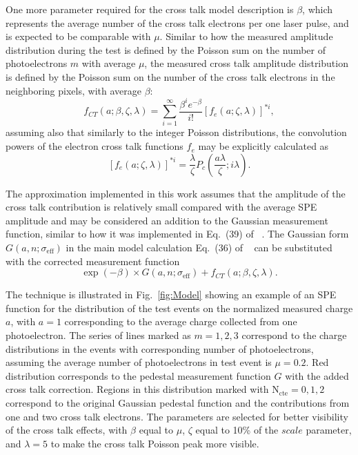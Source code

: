 One more parameter required for the cross talk model description is $\beta$, which represents the average number of the cross talk electrons per one laser pulse, and is expected to be comparable with $\mu$. Similar to how the measured amplitude distribution during the test is defined by the Poisson sum on the number of photoelectrons $m$ with average $\mu$, the measured cross talk amplitude distribution is defined by the Poisson sum on the number of the cross talk electrons in the neighboring pixels, with average $\beta$: 
\begin{equation}
\label{fCT}
 f_{CT}(a;\beta,\zeta,\lambda) = \sum\limits_{i=1}^{\infty}  \frac{\beta^{i} e^{-\beta}}{i!} \left [ f_{e}(a;\zeta,\lambda) \right ] ^{*i},
\end{equation}
assuming also that similarly to the integer Poisson distributions, the convolution powers of the electron cross talk functions $f_{e}$ may be explicitly calculated as  
\begin{equation}
\label{fe_cp}
 \left [ f_{e}(a;\zeta,\lambda) \right ] ^{*i} = \frac{\lambda}{\zeta} P_c \left (\frac{a \lambda}{\zeta};i\lambda \right ).
\end{equation}

The approximation implemented in this work assumes that the amplitude of the cross talk contribution is relatively small compared with the average SPE amplitude and may be considered an addition to the Gaussian measurement function, similar to how it was implemented in Eq.~(39) of ~\cite{DEGTIARENKO20171}. The Gaussian form $G(a,n;\sigma_{\mathrm{eff}})$ in the main model calculation Eq.~(36) of ~\cite{DEGTIARENKO20171} can be substituted with the corrected measurement function  
\begin{equation}
  \label{EMGform}
\exp(-\beta) \times G(a,n;\sigma_{\mathrm{eff}}) + f_{CT}(a;\beta,\zeta,\lambda) .
\end{equation}

The technique is illustrated in Fig.~\ref{fig:Model} showing an example of an SPE function for the distribution of the test events on the normalized measured charge $a$, with $a=1$ corresponding to the average charge collected from one photoelectron. The series of lines marked as $m = 1, 2, 3$ correspond to the charge distributions in the events with corresponding number of photoelectrons, assuming the average number of photoelectrons in test event is $\mu = 0.2$. Red distribution corresponds to the pedestal measurement function $G$ with the added cross talk correction. Regions in this distribution marked with $\mathrm{N_{cte}=0, 1, 2}$ correspond to the original Gaussian pedestal function and the contributions from one and two cross talk electrons. The parameters are selected for better visibility of the cross talk effects, with $\beta$ equal to $\mu$, $\zeta$ equal to 10\% of the $scale$ parameter, and $\lambda = 5$ to make the cross talk Poisson peak more visible.  

